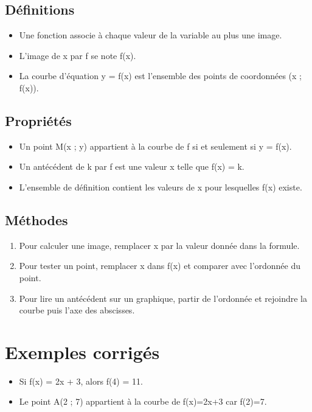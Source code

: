 \subsection{Définitions}

\begin{itemize}
\item Une fonction associe à chaque valeur de la variable au plus une image.
\item L'image de x par f se note f(x).
\item La courbe d'équation y = f(x) est l'ensemble des points de coordonnées (x ; f(x)).
\end{itemize}

\subsection{Propriétés}

\begin{itemize}
\item Un point M(x ; y) appartient à la courbe de f si et seulement si y = f(x).
\item Un antécédent de k par f est une valeur x telle que f(x) = k.
\item L'ensemble de définition contient les valeurs de x pour lesquelles f(x) existe.
\end{itemize}

\subsection{Méthodes}

\begin{enumerate}
\item Pour calculer une image, remplacer x par la valeur donnée dans la formule.
\item Pour tester un point, remplacer x dans f(x) et comparer avec l'ordonnée du point.
\item Pour lire un antécédent sur un graphique, partir de l'ordonnée et rejoindre la courbe puis l'axe des abscisses.
\end{enumerate}

\section{Exemples corrigés}

\begin{itemize}
\item Si f(x) = 2x + 3, alors f(4) = 11.
\item Le point A(2 ; 7) appartient à la courbe de f(x)=2x+3 car f(2)=7.
\end{itemize}

